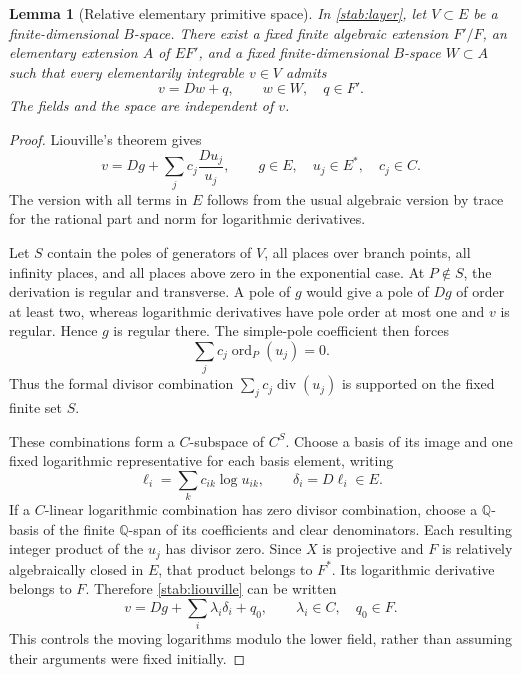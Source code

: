 \documentclass[11pt,a4paper]{article}
\newtheorem{lemma}[theorem]{Lemma}
\theoremstyle{definition}
\theoremstyle{remark}
\numberwithin{equation}{section}
\begin{document}
\begin{lemma}[Relative elementary primitive space]\label{stab:relative}
In \eqref{stab:layer}, let $V\subset E$ be a finite-dimensional
$B$-space.  There exist a fixed finite algebraic extension $F'/F$, an
elementary extension $A$ of $EF'$, and a fixed finite-dimensional
$B$-space $W\subset A$ such that every elementarily integrable $v\in V$
admits
\[
 v=Dw+q,\qquad w\in W,\quad q\in F'.
\]
The fields and the space are independent of $v$.
\end{lemma}
\begin{proof}
Liouville's theorem gives
\begin{equation}\label{stab:liouville}
 v=Dg+\sum_j c_j\frac{Du_j}{u_j},
 \qquad g\in E,\quad u_j\in E^*,\quad c_j\in C.
\end{equation}
The version with all terms in $E$ follows from the usual algebraic
version by trace for the rational part and norm for logarithmic
derivatives.

Let $S$ contain the poles of generators of $V$, all places over branch
points, all infinity places, and all places above zero in the
exponential case.  At $P\notin S$, the derivation is regular and
transverse.  A pole of $g$ would give a pole of $Dg$ of order at least
two, whereas logarithmic derivatives have pole order at most one and
$v$ is regular.  Hence $g$ is regular there.  The simple-pole
coefficient then forces
\[
 \sum_j c_j\operatorname{ord}_P(u_j)=0.
\]
Thus the formal divisor combination $\sum_jc_j\operatorname{div}(u_j)$
is supported on the fixed finite set $S$.

These combinations form a $C$-subspace of $C^S$.  Choose a basis of
its image and one fixed logarithmic representative for each basis
element, writing
\[
 \ell_i=\sum_k c_{ik}\log u_{ik},\qquad \delta_i=D\ell_i\in E.
\]
If a $C$-linear logarithmic combination has zero divisor combination,
choose a $\mathbb Q$-basis of the finite $\mathbb Q$-span of its
coefficients and clear denominators.  Each resulting integer product
of the $u_j$ has divisor zero.  Since $X$ is projective and $F$ is
relatively algebraically closed in $E$, that product belongs to
$F^*$.  Its logarithmic derivative belongs to $F$.  Therefore
\eqref{stab:liouville} can be written
\begin{equation}\label{stab:relative-equation}
 v=Dg+\sum_i\lambda_i\delta_i+q_0,
 \qquad \lambda_i\in C,\quad q_0\in F.
\end{equation}
This controls the moving logarithms modulo the lower field, rather
than assuming their arguments were fixed initially.


\end{proof}
\end{document}
